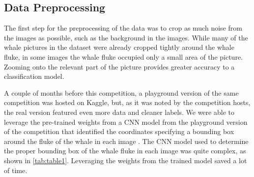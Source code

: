 \documentclass[paper=a4, fontsize=11pt]{scrartcl}
\numberwithin{equation}{section}		%
\numberwithin{table}{section}				%
\begin{document}
\subsection{Data Preprocessing}\label{subsec:Preprocessing}

The first step for the preprocessing of the data was to crop as much noise from the images as possible, such as the background in the images. While many of the whale pictures in the dataset were already cropped tightly around the whale fluke, in some images the whale fluke occupied only a small area of the picture. Zooming onto the relevant part of the picture provides greater accuracy to a classification model. 

A couple of months before this competition, a playground version of the same competition was hosted on Kaggle, but, as it was noted by the competition hosts, the real version featured even more data and cleaner labels. We were able to leverage the pre-trained weights from a CNN model from the playground version of the competition that identified the coordinates specifying a bounding box around the fluke of the whale in each image \cite{FlukeDetection}. The CNN model used to determine the proper bounding box of the whale fluke in each image was quite complex, as shown in \autoref{tab:table1}. Leveraging the weights from the trained model saved a lot of time.
\end{document}
